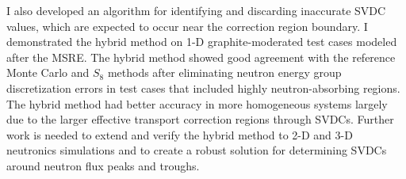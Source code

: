 I also developed an algorithm for identifying and discarding inaccurate \gls{SVDC} values, which
are expected to occur near the correction region boundary. I demonstrated the hybrid
method on 1-D graphite-moderated test cases modeled after the \gls{MSRE}. The hybrid method showed
good agreement with the reference Monte Carlo and $S_8$ methods after eliminating neutron energy
group discretization errors in test cases that included highly neutron-absorbing regions. The
hybrid method had better accuracy in more homogeneous systems largely due to the larger effective
transport correction regions through \glspl{SVDC}. Further work
is needed to extend and verify the hybrid method to 2-D and 3-D neutronics simulations and to
create a robust solution for determining \glspl{SVDC} around neutron flux peaks and troughs. 

